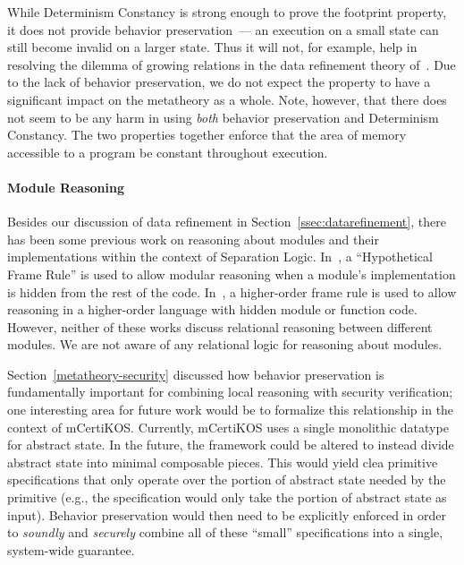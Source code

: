 While Determinism Constancy is strong enough to prove the footprint property, it does
not provide behavior preservation~--- an execution on a small state can still become
invalid on a larger state. Thus it will not, for example, help in resolving the dilemma 
of growing relations in the data refinement theory of~\cite{filipovic10}. Due to the lack of behavior 
preservation, we do not expect the property to have a significant impact on the metatheory
as a whole. Note, however, that there does not seem to be any harm in using \emph{both}
behavior preservation and Determinism Constancy. The two properties together enforce that
the area of memory accessible to a program be constant throughout execution.

\paragraph{Module Reasoning}
Besides our discussion of data refinement in
Section~\ref{ssec:datarefinement}, there has been some previous work
on reasoning about modules and their implementations within
the context of Separation Logic. In~\cite{oyr04},
a ``Hypothetical Frame Rule'' is used to allow modular reasoning when
a module's implementation is hidden from the rest of the
code. In~\cite{birkedal05}, a higher-order frame rule is used to allow
reasoning in a higher-order language with hidden module or function
code. However, neither of these works discuss relational reasoning
between different modules. We are not aware of any relational logic
for reasoning about modules.

\ifextended
Section~\ref{metatheory-security} discussed how behavior 
preservation is fundamentally important for combining local
reasoning with security verification; one interesting area
for future work would be to formalize this relationship
in the context of mCertiKOS. Currently, mCertiKOS uses a
single monolithic datatype for abstract state. In the future,
the framework could be altered to instead divide abstract
state into minimal composable pieces. This would yield clea
primitive specifications that only operate over the portion
of abstract state needed by the primitive (e.g., the 
specification would only take the  portion of abstract 
state as input). Behavior preservation would then need to be
explicitly enforced in order to \emph{soundly} and \emph{securely} combine 
all of these ``small'' specifications into a single, system-wide guarantee.

